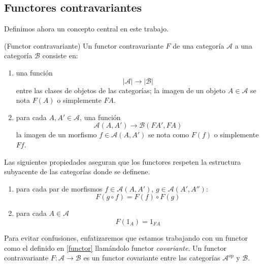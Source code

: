 \subsection{Functores contravariantes}
Definimos ahora un concepto central en este trabajo.

\begin{definicion}
    (Functor contravariante) Un functor contravariante $F$ de una categoría $\mathscr{A}$ a una categoría $\mathscr{B}$ consiste en:

    \begin{enumerate}
        \item una función \begin{equation}|\mathscr{A}| \longrightarrow |\mathscr{B}| \end{equation} entre las clases de objetos de las categorías; la imagen de un objeto $A \in \mathscr{A}$ se nota $F(A)$ o simplemente $FA$.

        \item para cada $A, A' \in \mathscr{A}$, una función \begin{equation}\mathscr{A}(A,A') \longrightarrow \mathscr{B}(FA',FA) \end{equation}
        la imagen de un morfismo $f \in \mathscr{A}(A,A')$ se nota como $F(f)$ o simplemente $Ff$.
    \end{enumerate}
\end{definicion}

\begin{observacion} Las siguientes propiedades aseguran que los functores respeten la estructura subyacente de las categorías donde se definene.
  \begin{enumerate}
        \item para cada par de morfismos $f \in \mathscr{A}(A,A')$, $g \in          \mathscr{A}(A',A''): $ \begin{equation} F(g \circ f) = F(f) \circ F(g)   \end{equation}

        \item para cada $A \in \mathscr{A}$ \begin{equation}
            F(1_{A}) = 1_{FA}
        \end{equation}
    \end{enumerate}  
\end{observacion}

Para evitar confusiones, enfatizaremos que estamos trabajando con un functor como el definido en \ref{functor} llamándolo functor \emph{covariante}. Un functor contravariante $F: \mathscr{A} \longrightarrow \mathscr{B}$ es un functor covariante entre las categorías $\mathscr{A}^{op}$ y $\mathscr{B}$.

